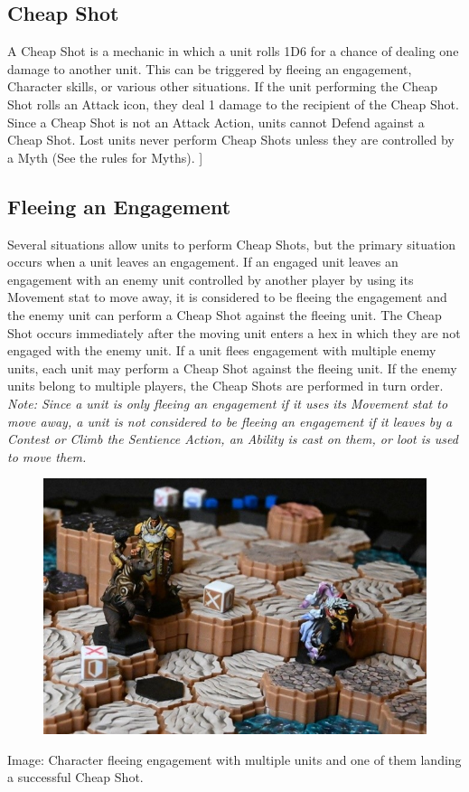 \documentclass[../main.tex]{subfiles}
\begin{document}
\subsection{Cheap Shot}
A Cheap Shot is a mechanic in which a unit rolls 1D6 for a chance of dealing one damage to another unit. This can be triggered by fleeing an engagement, Character skills, or various other situations. If the unit performing the Cheap Shot rolls an Attack icon, they deal 1 damage to the recipient of the Cheap Shot. Since a Cheap Shot is not an Attack Action, units cannot Defend against a Cheap Shot. Lost units never perform Cheap Shots unless they are controlled by a Myth (See the rules for Myths). ]

\subsection{Fleeing an Engagement}
Several situations allow units to perform Cheap Shots, but the primary situation occurs when a unit leaves an engagement. If an engaged unit leaves an engagement with an enemy unit controlled by another player by using its Movement stat to move away, it is considered to be fleeing the engagement and the enemy unit can perform a Cheap Shot against the fleeing unit. The Cheap Shot occurs immediately after the moving unit enters a hex in which they are not engaged with the enemy unit. If a unit flees engagement with multiple enemy units, each unit may perform a Cheap Shot against the fleeing unit. If the enemy units belong to multiple players, the Cheap Shots are performed in turn order.
\textit{Note: Since a unit is only fleeing an engagement if it uses its Movement stat to move away, a unit is not considered to be fleeing an engagement if it leaves by a Contest or Climb the Sentience Action, an Ability is cast on them, or loot is used to move them.}
\begin{figure}[h]
    \centering
    \includegraphics[width=1\linewidth]{chapters//Movement/TimeStrikeCharFleeingEngagement.jpg}
\end{figure}

Image: Character fleeing engagement with multiple units and one of them landing a successful Cheap Shot. 

\clearpage
\end{document}
